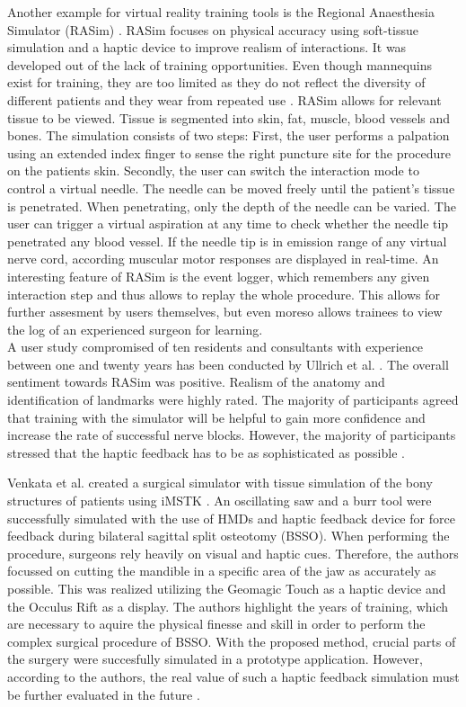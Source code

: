 Another example for virtual reality training tools is the Regional Anaesthesia Simulator
(RASim) \cite{RN70}. RASim focuses on physical accuracy using soft-tissue simulation and a haptic device to improve realism of interactions.
It was developed out of the lack of training opportunities. Even though mannequins exist
for training, they are too limited as they do not reflect the diversity of different patients
and they wear from repeated use \cite{RN70}. RASim allows for relevant tissue to be viewed. Tissue is segmented into skin, fat,
muscle, blood vessels and bones. The simulation consists of two steps: First, the user
performs a palpation using an extended index finger to sense the right puncture site for
the procedure on the patients skin. Secondly, the user can switch the interaction mode
to control a virtual needle. The needle can be moved freely until the patient’s tissue is
penetrated. When penetrating, only the depth of the needle can be varied. The user can
trigger a virtual aspiration at any time to check whether the needle tip penetrated any
blood vessel. If the needle tip is in emission range of any virtual nerve cord, according
muscular motor responses are displayed in real-time. An interesting feature of RASim is
the event logger, which remembers any given interaction step and thus allows to replay
the whole procedure. This allows for further assesment by users themselves, but even
moreso allows trainees to view the log of an experienced surgeon for learning.
\\ A user study compromised of ten residents and consultants with experience between one
and twenty years has been conducted by Ullrich et al. \cite{RN72}. The overall sentiment towards RASim was
positive. Realism of the anatomy and identification of landmarks were highly rated. The
majority of participants agreed that training with the simulator will be helpful to gain
more confidence and increase the rate of successful nerve blocks. However, the majority
of participants stressed that the haptic feedback has to be as sophisticated as possible \cite{RN72}.

Venkata et al. created a surgical simulator with tissue simulation of the 
bony structures of patients using iMSTK \cite{VenkataS.Arikatla.2018}.
An oscillating saw and a burr tool were successfully simulated 
with the use of HMDs and haptic feedback device for force feedback during 
bilateral sagittal split osteotomy (BSSO).
When performing the procedure, surgeons rely heavily on visual and haptic cues. 
Therefore,
the authors focussed on cutting the mandible in a specific 
area of the jaw as accurately as possible. This was realized utilizing 
the Geomagic Touch as a haptic device and the Occulus Rift as a 
display. The authors highlight the years of training, which are 
necessary to aquire the physical finesse and skill in order to 
perform the complex surgical procedure of BSSO. With the proposed 
method, crucial parts of the surgery
were succesfully simulated in a prototype application.
However, according to the authors, the real value of such a haptic feedback simulation must be
further evaluated in the future \cite{VenkataS.Arikatla.2018}.

